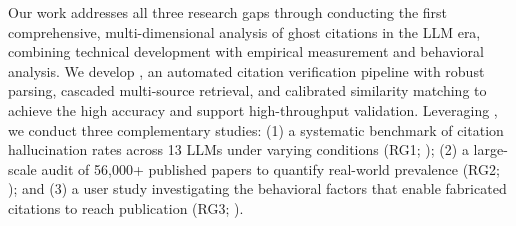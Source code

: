 Our work addresses all three research gaps through conducting the first comprehensive, multi-dimensional analysis of ghost citations in the LLM era, combining technical development with empirical measurement and behavioral analysis.
We develop \citeb, an automated citation verification pipeline with robust parsing, cascaded multi-source retrieval, and calibrated similarity matching to achieve the high accuracy and support high-throughput validation. Leveraging \citeb, we conduct three complementary studies: (1) a systematic benchmark of citation hallucination rates across 13 LLMs under varying conditions (RG1; ); (2) a large-scale audit of 56,000+ published papers to quantify real-world prevalence (RG2; ); and (3) a user study investigating the behavioral factors that enable fabricated citations to reach publication (RG3; ).
